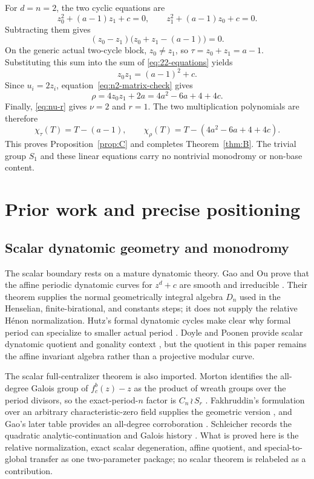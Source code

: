 \documentclass[11pt]{article}
\theoremstyle{definition}
\theoremstyle{remark}
\newcommand{\wrp}{\mathbin{\wr}}
\begin{document}
For $d=n=2$, the two cyclic equations are
\begin{equation}\label{eq:22-equations}
 z_0^2+(a-1)z_1+c=0,
 \qquad
 z_1^2+(a-1)z_0+c=0.
\end{equation}
Subtracting them gives
\begin{equation}\label{eq:22-factor}
 (z_0-z_1)\bigl(z_0+z_1-(a-1)\bigr)=0.
\end{equation}
On the generic actual two-cycle block, $z_0\ne z_1$, so
$\tau=z_0+z_1=a-1$.  Substituting this sum into the sum of
\eqref{eq:22-equations} yields
\[
 z_0z_1=(a-1)^2+c.
\]
Since $u_i=2z_i$, equation~\eqref{eq:n2-matrix-check} gives
\[
 \rho=4z_0z_1+2a=4a^2-6a+4+4c.
\]
Finally, \eqref{eq:nu-r} gives $\nu=2$ and $r=1$.  The two multiplication
polynomials are therefore
\[
 \chi_\tau(T)=T-(a-1),\qquad
 \chi_\rho(T)=T-(4a^2-6a+4+4c).
\]
This proves Proposition~\ref{prop:C} and completes
Theorem~\ref{thm:B}.  The trivial group $S_1$ and these linear equations
carry no nontrivial monodromy or non-base content.

\section{Prior work and precise positioning}\label{sec:prior}

\subsection{Scalar dynatomic geometry and monodromy}

The scalar boundary rests on a mature dynatomic theory.  Gao and Ou prove
that the affine periodic dynatomic curves for $z^d+c$ are smooth and
irreducible \citep{gao-ou-2014-dynatomic}.  Their theorem supplies the
normal geometrically integral algebra $D_n$ used in the Henselian,
finite-birational, and constants steps; it does not supply the relative
H\'{e}non normalization.  Hutz's formal dynatomic cycles make clear why
formal period can specialize to smaller actual period
\citep{hutz-2010-dynatomic-cycles}.  Doyle and Poonen provide scalar
dynatomic quotient and gonality context \citep{doyle-poonen-2020-gonality},
but the quotient in this paper remains the affine invariant algebra rather
than a projective modular curve.

The scalar full-centralizer theorem is also imported.  Morton identifies the
all-degree Galois group of $f_c^b(z)-z$ as the product of wreath groups over
the period divisors, so the exact-period-$n$ factor is $C_n\wrp S_r$
\citep{morton-1998-periodic-galois}.  Fakhruddin's formulation over an
arbitrary characteristic-zero field supplies the geometric version
\citep{fakhruddin-2014-generic-endomorphisms}, and Gao's later table provides
an all-degree corroboration \citep{gao-2016-preperiodic-dynatomic}.
Schleicher records the quadratic analytic-continuation and Galois history
\citep{schleicher-2017-internal-addresses}.  What is proved here is the
relative normalization, exact scalar degeneration, affine quotient, and
special-to-global transfer as one two-parameter package; no scalar theorem is
relabeled as a contribution.
\end{document}
